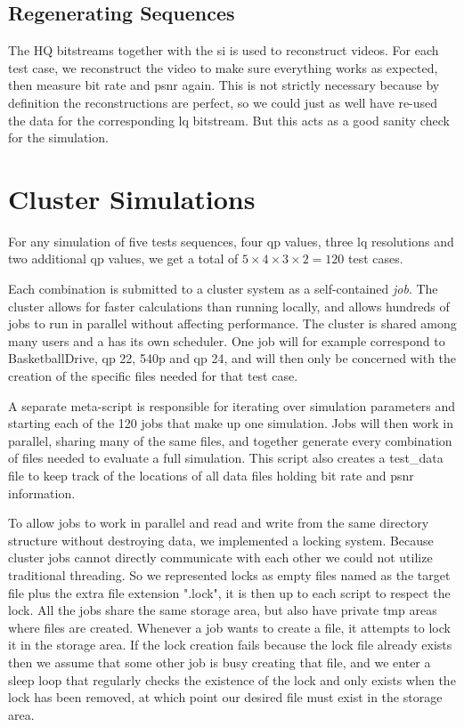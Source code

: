 \subsection{Regenerating Sequences}
The HQ bitstreams together with the \gls{si} is used to reconstruct videos. For each test case, we reconstruct the video to make sure everything works as expected, then measure bit rate and \gls{psnr} again. This is not strictly necessary because by definition the reconstructions are perfect, so we could just as well have re-used the data for the corresponding \gls{lq} bitstream. But this acts as a good sanity check for the simulation.


\section{Cluster Simulations}
\label{subsec:cluster}
For any simulation of five tests sequences, four \gls{qp} values, three \gls{lq} resolutions and two additional \gls{qp} values, we get a total of $5 \times 4 \times 3 \times2 = 120$ test cases.

Each combination is submitted to a cluster system as a self-contained \textit{job}. The cluster allows for faster calculations than running locally, and allows hundreds of jobs to run in parallel without affecting performance. The cluster is shared among many users and a has its own scheduler. One job will for example correspond to BasketballDrive, \gls{qp} 22, 540p and \gls{qp} 24, and will then only be concerned with the creation of the specific files needed for that test case.

A separate meta-script is responsible for iterating over simulation parameters and starting each of the 120 jobs that make up one simulation. Jobs will then work in parallel, sharing many of the same files, and together generate every combination of files needed to evaluate a full simulation. This script also creates a test{\_}data file to keep track of the locations of all data files holding bit rate and \gls{psnr} information.

To allow jobs to work in parallel and read and write from the same directory structure without destroying data, we implemented a locking system. Because cluster jobs cannot directly communicate with each other we could not utilize traditional threading. So we represented locks as empty files named as the target file plus the extra file extension ".lock", it is then up to each script to respect the lock. All the jobs share the same storage area, but also have private tmp areas where files are created. Whenever a job wants to create a file, it attempts to lock it in the storage area. If the lock creation fails because the lock file already exists then we assume that some other job is busy creating that file, and we enter a sleep loop that regularly checks the existence of the lock and only exists when the lock has been removed, at which point our desired file must exist in the storage area.

